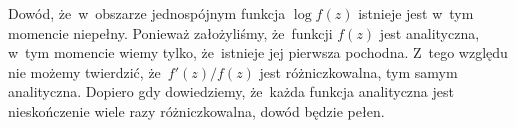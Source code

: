 \documentclass[a4paper,11pt]{article}
\begin{document}
\vspace{\spaceFour}



\start {} Dowód, że~w~obszarze jednospójnym funkcja
$\log f( z )$ istnieje jest w~tym momencie niepełny. Ponieważ
założyliśmy, że~funkcji $f( z )$ jest analityczna, w~tym momencie
wiemy tylko, że~istnieje jej pierwsza pochodna. Z~tego względu nie
możemy twierdzić, że~$f'( z ) / f( z )$ jest różniczkowalna, tym samym
analityczna. Dopiero gdy dowiedziemy, że~każda funkcja analityczna
jest nieskończenie wiele razy różniczkowalna, dowód będzie pełen.

\vspace{\spaceFour}




\end{document}
